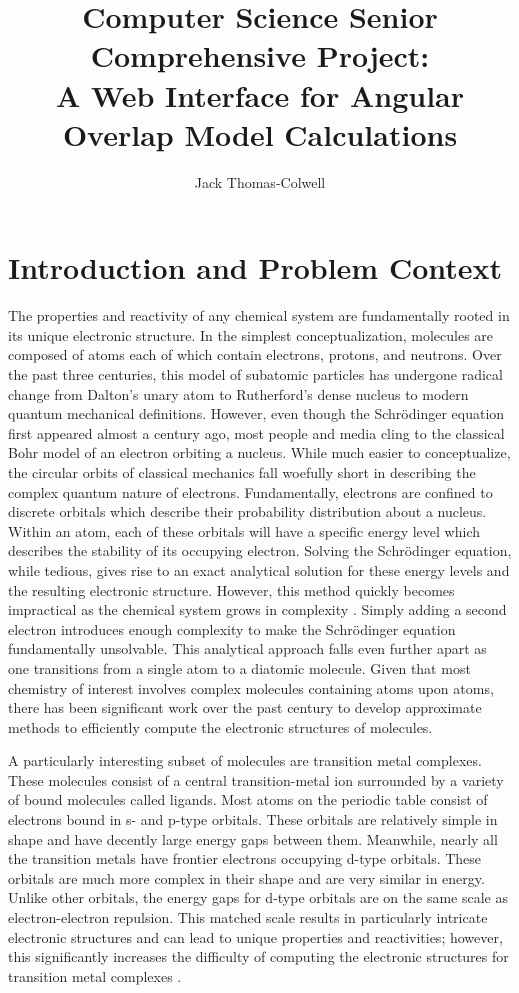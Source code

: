 \documentclass[10pt,twocolumn]{article}
\title{Computer Science Senior Comprehensive Project: \\A Web Interface for Angular Overlap Model Calculations}
\author{Jack Thomas-Colwell}
\affiliation{Occidental College}
\begin{document}
\maketitle
\newpage
\section{Introduction and Problem Context}
The properties and reactivity of any chemical system are fundamentally rooted in its unique electronic structure. In the simplest conceptualization, molecules are composed of atoms each of which contain electrons, protons, and neutrons. Over the past three centuries, this model of subatomic particles has undergone radical change from Dalton’s unary atom to Rutherford’s dense nucleus to modern quantum mechanical definitions. However, even though the Schrödinger equation first appeared almost a century ago, most people and media cling to the classical Bohr model of an electron orbiting a nucleus. While much easier to conceptualize, the circular orbits of classical mechanics fall woefully short in describing the complex quantum nature of electrons. Fundamentally, electrons are confined to discrete orbitals which describe their probability distribution about a nucleus. Within an atom, each of these orbitals will have a specific energy level which describes the stability of its occupying electron. Solving the Schrödinger equation, while tedious, gives rise to an exact analytical solution for these energy levels and the resulting electronic structure. However, this method quickly becomes impractical as the chemical system grows in complexity \cite{atkins2014}. Simply adding a second electron introduces enough complexity to make the Schrödinger equation fundamentally unsolvable. This analytical approach falls even further apart as one transitions from a single atom to a diatomic molecule. Given that most chemistry of interest involves complex molecules containing atoms upon atoms, there has been significant work over the past century to develop approximate methods to efficiently compute the electronic structures of molecules.

A particularly interesting subset of molecules are transition metal complexes. These molecules consist of a central transition-metal ion surrounded by a variety of bound molecules called ligands. Most atoms on the periodic table consist of electrons bound in s- and p-type orbitals. These orbitals are relatively simple in shape and have decently large energy gaps between them. Meanwhile, nearly all the transition metals have frontier electrons occupying d-type orbitals. These orbitals are much more complex in their shape and are very similar in energy. Unlike other orbitals, the energy gaps for d-type orbitals are on the same scale as electron-electron repulsion. This matched scale results in particularly intricate electronic structures and can lead to unique properties and reactivities; however, this significantly increases the difficulty of computing the electronic structures for transition metal complexes \cite{figgis2002}.
\end{document}
